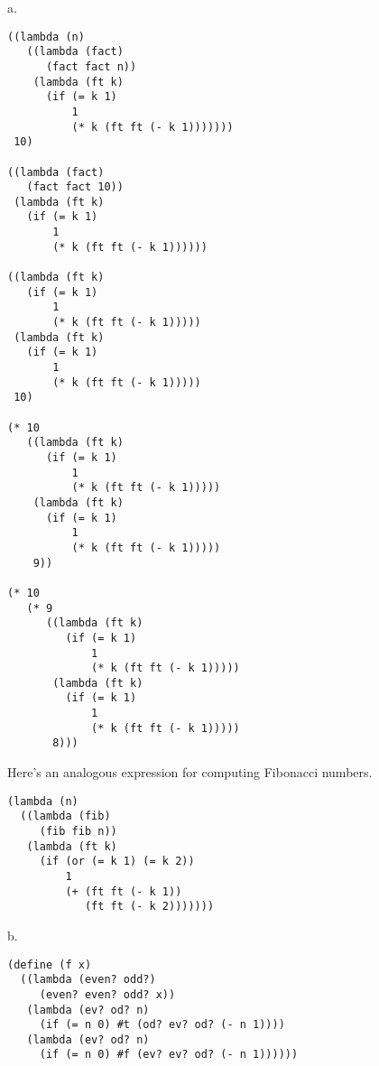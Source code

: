 \documentclass[a4paper,12pt]{article}
\newcommand{\subpar}[1]{\medskip \noindent #1.}
\begin{document}
\subpar{a}

\begin{lstlisting}
((lambda (n)
   ((lambda (fact)
      (fact fact n))
    (lambda (ft k)
      (if (= k 1)
          1
          (* k (ft ft (- k 1)))))))
 10)

((lambda (fact)
   (fact fact 10))
 (lambda (ft k)
   (if (= k 1)
       1
       (* k (ft ft (- k 1))))))

((lambda (ft k)
   (if (= k 1)
       1
       (* k (ft ft (- k 1)))))
 (lambda (ft k)
   (if (= k 1)
       1
       (* k (ft ft (- k 1)))))
 10)

(* 10
   ((lambda (ft k)
      (if (= k 1)
          1
          (* k (ft ft (- k 1)))))
    (lambda (ft k)
      (if (= k 1)
          1
          (* k (ft ft (- k 1)))))
    9))

(* 10
   (* 9
      ((lambda (ft k)
         (if (= k 1)
             1
             (* k (ft ft (- k 1)))))
       (lambda (ft k)
         (if (= k 1)
             1
             (* k (ft ft (- k 1)))))
       8)))
\end{lstlisting}

Here's an analogous expression for computing Fibonacci numbers.

\begin{lstlisting}
(lambda (n)
  ((lambda (fib)
     (fib fib n))
   (lambda (ft k)
     (if (or (= k 1) (= k 2))
         1
         (+ (ft ft (- k 1))
            (ft ft (- k 2)))))))
\end{lstlisting}

\subpar{b}
\begin{lstlisting}
(define (f x)
  ((lambda (even? odd?)
     (even? even? odd? x))
   (lambda (ev? od? n)
     (if (= n 0) #t (od? ev? od? (- n 1))))
   (lambda (ev? od? n)
     (if (= n 0) #f (ev? ev? od? (- n 1))))))
\end{lstlisting}
\end{document}
